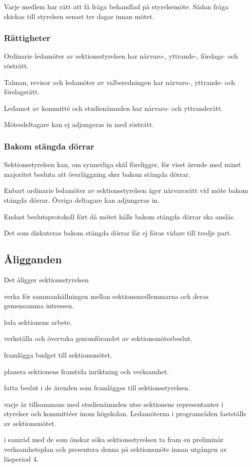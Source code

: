 \documentclass{styrdokument}
\begin{document}
\? Varje medlem har rätt att få fråga behandlad på styrelsemöte.
Sådan fråga skickas till styrelsen senast tre dagar innan mötet.

\subsubsection{Rättigheter}
\? Ordinarie ledamöter av sektionsstyrelsen har närvaro-, yttrande-, förslags- och rösträtt. 

\? Talman, revisor och ledamöter av valberedningen har närvaro-, yttrande- och förslagsrätt.
		
\? Ledamot av kommitté och studienämnden har närvaro- och yttranderätt.
		
\? Mötesdeltagare kan ej adjungeras in med rösträtt.

\subsubsection{Bakom stängda dörrar}
\? Sektionsstyrelsen kan, om synnerliga skäl föreligger, för visst ärende med minst  majoritet besluta att överläggning sker bakom stängda dörrar.

\? Enbart ordinarie ledamöter av sektionsstyrelsen äger närvarorätt vid möte bakom stängda dörrar.
Övriga deltagare kan adjungeras in.

\? Endast beslutsprotokoll fört då mötet hålls bakom stängda dörrar ska anslås.

\? Det som diskuteras bakom stängda dörrar får ej föras vidare till tredje part. 

\subsection{Åligganden}
\? Det åligger sektionsstyrelsen
\begin{aligganden}
    \item verka för sammanhållningen mellan sektionsmedlemmarna och deras gemensamma intressen.
	\item leda sektionens arbete.
	\item verkställa och övervaka genomförandet av sektionsmötesbeslut.
	\item framlägga budget till sektionsmötet.
	\item planera sektionens framtida inriktning och verksamhet.
	\item fatta beslut i de ärenden som framlägges till sektionsstyrelsen.
	\item varje år tillsammans med studienämnden utse sektionens representanter i styrelser och kommittéer inom högskolan.
	    Ledamöterna i programråden fastställs av sektionsmötet.
	\item i samråd med de som önskar söka sektionsstyrelsen ta fram en preliminär verksamhetsplan och presentera denna på sektionsmöte innan utgången av läsperiod 4.
\end{aligganden}
\end{document}
